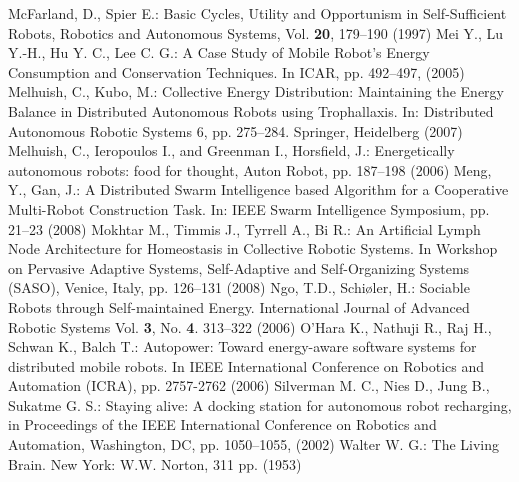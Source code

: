 \documentclass[journal]{IEEEtran}
\begin{document}
\begin{thebibliography}{1}
McFarland, D., Spier E.: Basic Cycles, Utility and Opportunism in Self-Sufficient Robots, Robotics and Autonomous Systems, Vol. \textbf{20}, 179--190 (1997)
Mei Y., Lu Y.-H., Hu Y. C., Lee C. G.: A Case Study of Mobile Robot's Energy Consumption and Conservation Techniques. In ICAR, pp. 492--497, (2005)
Melhuish, C., Kubo, M.: Collective Energy Distribution: Maintaining the Energy Balance in Distributed Autonomous Robots using Trophallaxis. In: Distributed Autonomous Robotic Systems 6, pp. 275--284. Springer, Heidelberg (2007)
Melhuish, C., Ieropoulos I., and  Greenman I., Horsfield, J.: Energetically autonomous robots: food for thought, Auton Robot, pp. 187--198 (2006)
Meng, Y., Gan, J.: A Distributed Swarm Intelligence based Algorithm for a Cooperative Multi-Robot Construction Task. In: IEEE Swarm Intelligence Symposium, pp. 21--23 (2008)
Mokhtar M., Timmis J., Tyrrell A., Bi R.: An Artificial Lymph Node Architecture for Homeostasis in Collective Robotic Systems. In Workshop on Pervasive Adaptive Systems, Self-Adaptive and Self-Organizing Systems (SASO), Venice, Italy, pp. 126--131 (2008)
Ngo, T.D., Schi\o ler, H.: Sociable Robots through Self-maintained Energy. International Journal of Advanced Robotic Systems Vol. \textbf{3}, No. \textbf{4}. 313--322 (2006)
O'Hara K., Nathuji R., Raj H., Schwan K., Balch T.: Autopower: Toward energy-aware software systems for distributed mobile robots. In IEEE International Conference on Robotics and Automation (ICRA), pp. 2757-2762 (2006)
Silverman M. C., Nies D., Jung B., Sukatme G. S.: Staying alive: A docking station for autonomous robot recharging, in Proceedings of the IEEE International Conference on Robotics and Automation, Washington, DC, pp. 1050--1055, (2002)
Walter W. G.: The Living Brain. New York: W.W. Norton, 311 pp. (1953)
\end{thebibliography}

% 
\end{document}
